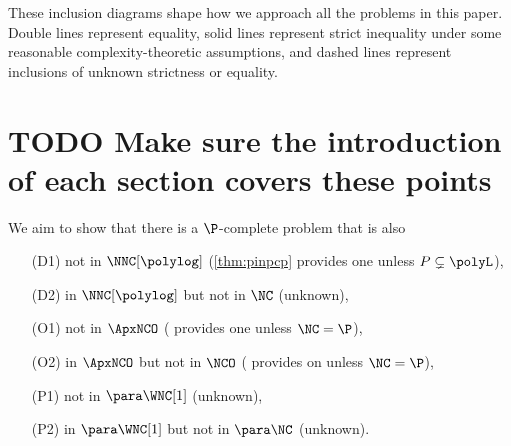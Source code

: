 These inclusion diagrams shape how we approach all the problems in this paper.
Double lines represent equality, solid lines represent strict inequality under some reasonable complexity-theoretic assumptions, and dashed lines represent inclusions of unknown strictness or equality.



\section{TODO Make sure the introduction of each section covers these points}
We aim to show that there is a $\P$-complete problem that is also
\begin{enumerate}
\item[(D1)] not in $\NNC[\polylog]$ (\autoref{thm:pinpcp} provides one unless $P \subsetneq \polyL$),
\item[(D2)] in $\NNC[\polylog]$ but not in $\NC$ (unknown),
\item[(O1)] not in $\ApxNCO$ (\autocite[Theorem~3.25]{ncapproximation} provides one unless $\NC = \P$),
\item[(O2)] in $\ApxNCO$ but not in $\NCO$ (\autocite[Theorem~3.25]{ncapproximation} provides on unless $\NC = \P$),
\item[(P1)] not in $\para \WNC[1]$ (unknown),
\item[(P2)] in $\para \WNC[1]$ but not in $\para \NC$ (unknown).
\end{enumerate}
